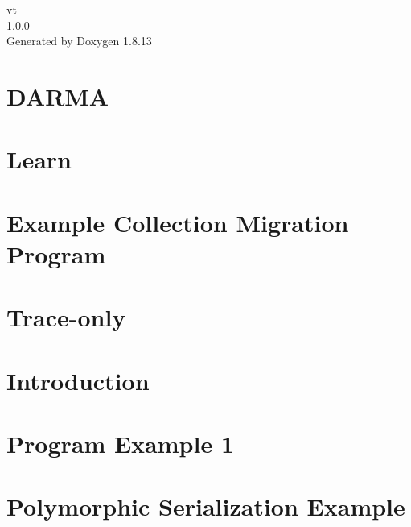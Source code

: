 \documentclass[twoside]{book}
\newcommand{\+}{\discretionary{\mbox{\scriptsize$\hookleftarrow$}}{}{}}
\newcommand{\clearemptydoublepage}{%
  \newpage{\pagestyle{empty}\cleardoublepage}%
}
\begin{document}
\hypersetup{pageanchor=false,
             bookmarksnumbered=true,
             pdfencoding=unicode
            }
\begin{titlepage}
\vspace*{7cm}
\begin{center}%
{\Large vt \\[1ex]\large 1.\+0.\+0 }\\
\vspace*{1cm}
{\large Generated by Doxygen 1.8.13}\\
\end{center}
\end{titlepage}
\clearemptydoublepage
{}
\tableofcontents
\clearemptydoublepage
{}
\hypersetup{pageanchor=true}

\chapter{D\+A\+R\+MA}
\label{index}\hypertarget{index}{}
\chapter{Learn}
\label{learn}

\chapter{Example Collection Migration Program}
\label{migrate-collection-example}

\chapter{Trace-\/only}
\label{trace-only}

\chapter{Introduction}
\label{introduction}

\chapter{Program Example 1}
\label{ckpt_learn_ex1}

\chapter{Polymorphic Serialization Example}
\label{ckpt_learn_example_polymorphic}

\end{document}
